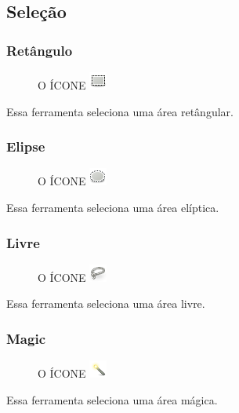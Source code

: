 \documentclass[12pt,onecolumn]{article}
\begin{document}
  \subsection{Seleção}
    \subsubsection{Retângulo}
      \begin{figure}[H]
        O ÍCONE
        \includegraphics{gimp-icons/stock-tool-rect-select-22.png}
        \label{fig:rectselect}
      \end{figure}
      Essa ferramenta seleciona uma área retângular.

      \subsubsection{Elipse}
      \begin{figure}[H]
        O ÍCONE
        \includegraphics{gimp-icons/stock-tool-ellipse-select-22.png}
        \label{fig:ellipseselect}
      \end{figure}
      Essa ferramenta seleciona uma área elíptica.

      \subsubsection{Livre}
      \begin{figure}[H]
        O ÍCONE
        \includegraphics{gimp-icons/stock-tool-free-select-22.png}
        \label{fig:freeselect}
      \end{figure}
      Essa ferramenta seleciona uma área livre.
      
      \subsubsection{Magic}
      \begin{figure}[H]
        O ÍCONE
        \includegraphics{gimp-icons/stock-tool-fuzzy-select-22.png}
        \label{fig:magicselect}
      \end{figure}
      Essa ferramenta seleciona uma área mágica.
\end{document}
